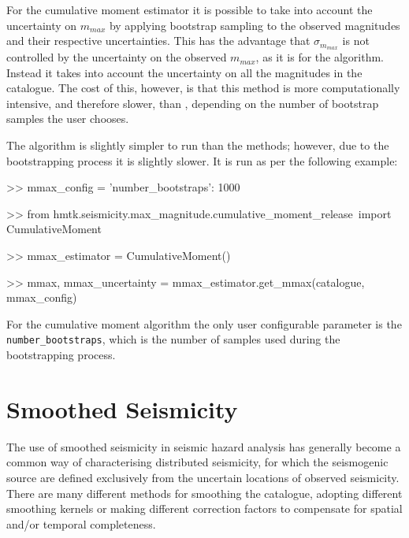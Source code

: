For the cumulative moment estimator it is possible to take into account the uncertainty on $m_{max}$ by applying bootstrap sampling to the observed magnitudes and their respective uncertainties. This has the advantage that $\sigma_{m_{max}}$ is not controlled by the uncertainty on the observed $m_{max}$, as it is for the \textcite{Kijko2004} algorithm. Instead it takes into account the uncertainty on all the magnitudes in the catalogue. The cost of this, however, is that this method is more computationally intensive, and therefore slower, than \textcite{Kijko2004}, depending on the number of bootstrap samples the user chooses.

The algorithm is slightly simpler to run than the \textcite{Kijko2004} methods; however, due to the bootstrapping process it is slightly slower. It is run as per the following example:

\begin{python}[frame=single]

>> mmax_config = {'number_bootstraps': 1000}
                       
>> from hmtk.seismicity.max_magnitude.cumulative_moment_release\
     import CumulativeMoment

>> mmax_estimator = CumulativeMoment()

>> mmax, mmax_uncertainty = mmax_estimator.get_mmax(catalogue,
                                                    mmax_config)
                
\end{python}

For the cumulative moment algorithm the only user configurable parameter is the \\ \verb=number_bootstraps=, which is the number of samples used during the bootstrapping process. 

\section{Smoothed Seismicity}

The use of smoothed seismicity in seismic hazard analysis has generally become a common way of characterising distributed seismicity, for which the seismogenic source are defined exclusively from the uncertain locations of observed seismicity. There are many different methods for smoothing the catalogue, adopting different smoothing kernels or making different correction factors to compensate for spatial and/or temporal completeness. 

\subsection{\textcite{frankel1995}}

